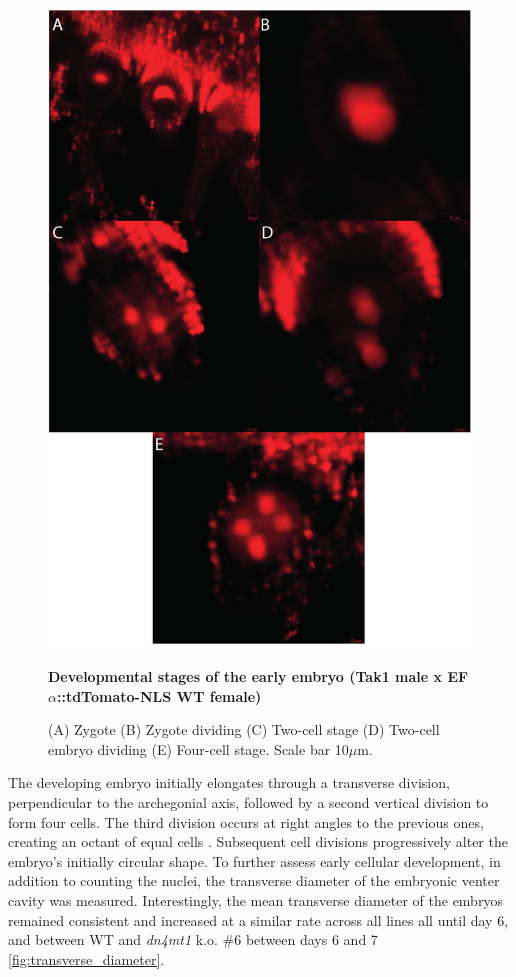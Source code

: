 \begin{figure}[htbp!] 
\centering    
    \includegraphics[width=1\textwidth]{Chapter3/Figs/Figure10_Developmental_stages.pdf}
\caption{\textbf{Developmental stages of the early embryo (Tak1 male x EF$\alpha$::tdTomato-NLS WT female)}}
\label{fig:dev_stages}
\captionsetup{font=small}
    \caption*{(A) Zygote (B) Zygote dividing (C) Two-cell stage (D) Two-cell embryo dividing (E) Four-cell stage. Scale bar 10$\mu$m.}
\end{figure}

The developing embryo initially elongates through a transverse division, perpendicular to the archegonial axis, followed by a second vertical division to form four cells. The third division occurs at right angles to the previous ones, creating an octant of equal cells \citep{RN143,RN144}. Subsequent cell divisions progressively alter the embryo's initially circular shape. To further assess early cellular development, in addition to counting the nuclei, the transverse diameter of the embryonic venter cavity was measured. Interestingly, the mean transverse diameter of the embryos remained consistent and increased at a similar rate across all lines all until day 6, and between WT and \textit{dn4mt1} k.o. \#6 between days 6 and 7 \ref{fig:transverse_diameter}.

